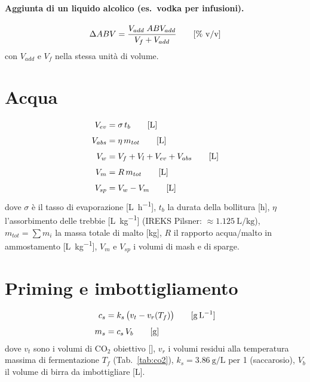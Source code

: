 \paragraph{Aggiunta di un liquido alcolico (es.\ vodka per infusioni).}
\begin{equation}
\Delta ABV = \frac{V_{add}\; ABV_{add}}{V_f + V_{add}} \qquad [\si{\percent} \text{ v/v}]
\end{equation}
con $V_{add}$ e $V_f$ nella stessa unità di volume.

\section{Acqua}

\begin{align}
V_{ev} &= \sigma\, t_b \qquad [\si{\liter}] \\[4pt]
V_{abs} &= \eta\, m_{tot} \qquad [\si{\liter}] \\[4pt]
V_{w} &= V_f + V_l + V_{ev} + V_{abs} \qquad [\si{\liter}] \\[4pt]
V_{m} &= R\, m_{tot} \qquad [\si{\liter}] \\[4pt]
V_{sp} &= V_{w} - V_{m} \qquad [\si{\liter}]
\end{align}
dove $\sigma$ è il tasso di evaporazione [\si{\liter\per\hour}], $t_b$ la durata della bollitura [\si{\hour}], $\eta$ l'assorbimento delle trebbie [\si{\liter\per\kilo\gram}] (IREKS Pilsner: $\approx\SI{1,125}{\liter\per\kilo\gram}$), $m_{tot} = \sum m_i$ la massa totale di malto [\si{\kilo\gram}], $R$ il rapporto acqua/malto in ammostamento [\si{\liter\per\kilo\gram}], $V_m$ e $V_{sp}$ i volumi di mash e di sparge.

\section{Priming e imbottigliamento}

\begin{align}
c_s &= k_s\,\bigl(v_{t} - v_{r}(T_f)\bigr) \qquad [\si{\gram\per\liter}] \\[4pt]
m_s &= c_s\, V_{b} \qquad [\si{\gram}]
\end{align}
dove $v_t$ sono i volumi di CO$_2$ obiettivo [\si{\vol}], $v_r$ i volumi residui alla temperatura massima di fermentazione $T_f$ (Tab.~\ref{tab:co2}), $k_s = \SI{3,86}{\gram\per\liter}$ per \SI{1}{\vol} (saccarosio), $V_b$ il volume di birra da imbottigliare [\si{\liter}].

